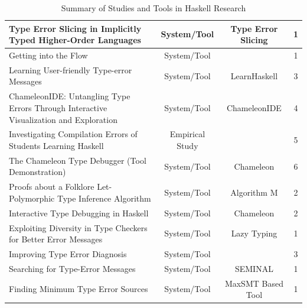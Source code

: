 \documentclass[pdflatex,lineno,sn-nature,Numbered]{sn-jnl}%
\begin{document}
\begin{table}[h]
\begin{tabular}{|p{5cm}|c|c|c|}
  \raggedright
    Type Error Slicing in Implicitly Typed Higher-Order Languages &
    System/Tool &
    Type Error Slicing &
    1 \\ \hline

  \raggedright
    Getting into the Flow &
    System/Tool &
    &
    1 \\ \hline

  \raggedright
    Learning User-friendly Type-error Messages &
    System/Tool &
    LearnHaskell &
    3 \\ \hline

  \raggedright
    ChameleonIDE: Untangling Type Errors Through Interactive Visualization and Exploration &
    System/Tool &
    ChameleonIDE &
    4 \\ \hline

  \raggedright
    Investigating Compilation Errors of Students Learning Haskell &
    Empirical Study &
    &
    5 \\ \hline

  \raggedright
    The Chameleon Type Debugger (Tool Demonstration) &
    System/Tool &
    Chameleon &
    6 \\ \hline

  \raggedright
    Proofs about a Folklore Let-Polymorphic Type Inference Algorithm &
    System/Tool &
    Algorithm M &
    2 \\ \hline

  \raggedright
    Interactive Type Debugging in Haskell &
    System/Tool &
    Chameleon &
    2 \\ \hline

  \raggedright
    Exploiting Diversity in Type Checkers for Better Error Messages &
    System/Tool &
    Lazy Typing &
    1 \\ \hline

  \raggedright
    Improving Type Error Diagnosis &
    System/Tool &
    &
    3 \\ \hline

  \raggedright
    Searching for Type-Error Messages &
    System/Tool &
    SEMINAL &
    1 \\ \hline

  \raggedright
    Finding Minimum Type Error Sources &
    System/Tool &
    MaxSMT Based Tool &
    1 \\ \hline

\end{tabular}
\caption{Summary of Studies and Tools in Haskell Research}
\label{tab:haskell-research}
\end{table}
\end{document}

